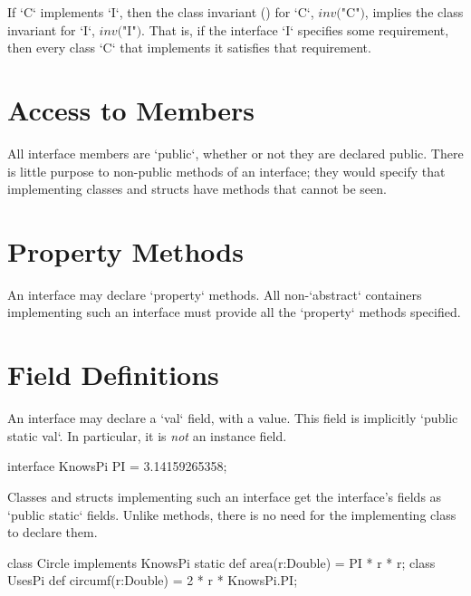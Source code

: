 If \xcd`C` implements \xcd`I`, then the class invariant
() for \xcd`C`,   $\mathit{inv}($\xcd"C"$)$, implies
the class invariant for \xcd`I`, $\mathit{inv}($\xcd"I"$)$.  That is, if the
interface \xcd`I` specifies some requirement, then every class \xcd`C` that
implements it satisfies that requirement.

\section{Access to Members}

All interface members are \xcd`public`, whether or not they are declared
public.  There is little purpose to non-public methods of an interface; they
would specify that implementing classes and structs have methods that cannot
be seen.

\section{Property Methods}

An interface may declare \xcd`property` methods.  All non-\xcd`abstract`
containers implementing such an interface must provide all the \xcd`property`
methods specified.  

\section{Field Definitions}

An interface may declare a \xcd`val` field, with a value.  This field is implicitly
\xcd`public static val`.  In particular, it is {\em not} an instance field. 
\begin{xten}
interface KnowsPi {
  PI = 3.14159265358;
}
\end{xten}
%

Classes and structs implementing such an interface get the interface's fields as
\xcd`public static` fields.  Unlike  methods, there is no need
for the implementing class to declare them. 
\begin{xten}
class Circle implements KnowsPi {
  static def area(r:Double) = PI * r * r;
}
class UsesPi {
  def circumf(r:Double) = 2 * r * KnowsPi.PI;
}
\end{xten}
%

